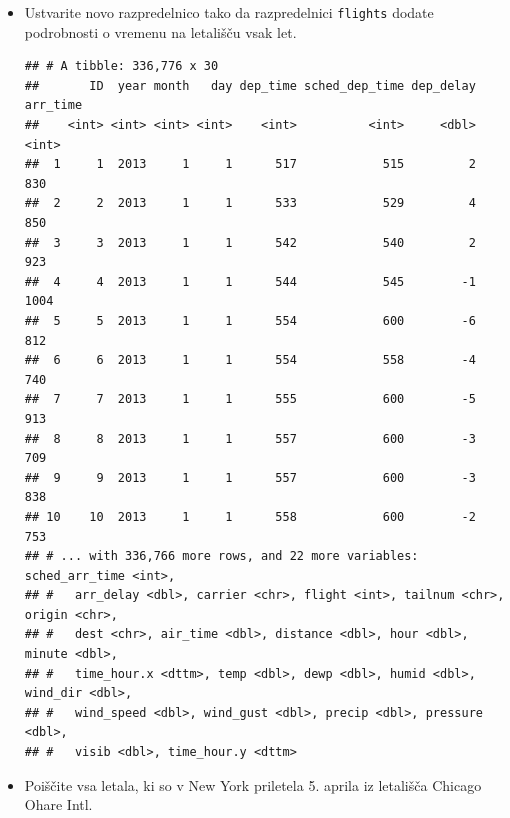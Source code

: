 \documentclass[
]{book}
\begin{document}
\begin{itemize}
\begin{verbatim}
## # A tibble: 336,776 x 28
##       ID year.x month   day dep_time sched_dep_time dep_delay arr_time
##    <int>  <int> <int> <int>    <int>          <int>     <dbl>    <int>
##  1     1   2013     1     1      517            515         2      830
##  2     2   2013     1     1      533            529         4      850
##  3     3   2013     1     1      542            540         2      923
##  4     4   2013     1     1      544            545        -1     1004
##  5     5   2013     1     1      554            600        -6      812
##  6     6   2013     1     1      554            558        -4      740
##  7     7   2013     1     1      555            600        -5      913
##  8     8   2013     1     1      557            600        -3      709
##  9     9   2013     1     1      557            600        -3      838
## 10    10   2013     1     1      558            600        -2      753
## # ... with 336,766 more rows, and 20 more variables: sched_arr_time <int>,
## #   arr_delay <dbl>, carrier <chr>, flight <int>, tailnum <chr>, origin <chr>,
## #   dest <chr>, air_time <dbl>, distance <dbl>, hour <dbl>, minute <dbl>,
## #   time_hour <dttm>, year.y <int>, type <chr>, manufacturer <chr>,
## #   model <chr>, engines <int>, seats <int>, speed <int>, engine <chr>
\end{verbatim}
\item
  Ustvarite novo razpredelnico tako da razpredelnici \texttt{flights} dodate podrobnosti o vremenu na letališču vsak let.

\begin{verbatim}
## # A tibble: 336,776 x 30
##       ID  year month   day dep_time sched_dep_time dep_delay arr_time
##    <int> <int> <int> <int>    <int>          <int>     <dbl>    <int>
##  1     1  2013     1     1      517            515         2      830
##  2     2  2013     1     1      533            529         4      850
##  3     3  2013     1     1      542            540         2      923
##  4     4  2013     1     1      544            545        -1     1004
##  5     5  2013     1     1      554            600        -6      812
##  6     6  2013     1     1      554            558        -4      740
##  7     7  2013     1     1      555            600        -5      913
##  8     8  2013     1     1      557            600        -3      709
##  9     9  2013     1     1      557            600        -3      838
## 10    10  2013     1     1      558            600        -2      753
## # ... with 336,766 more rows, and 22 more variables: sched_arr_time <int>,
## #   arr_delay <dbl>, carrier <chr>, flight <int>, tailnum <chr>, origin <chr>,
## #   dest <chr>, air_time <dbl>, distance <dbl>, hour <dbl>, minute <dbl>,
## #   time_hour.x <dttm>, temp <dbl>, dewp <dbl>, humid <dbl>, wind_dir <dbl>,
## #   wind_speed <dbl>, wind_gust <dbl>, precip <dbl>, pressure <dbl>,
## #   visib <dbl>, time_hour.y <dttm>
\end{verbatim}
\item
  Poiščite vsa letala, ki so v New York priletela 5. aprila iz letališča Chicago Ohare Intl.


\end{itemize}
\end{document}
